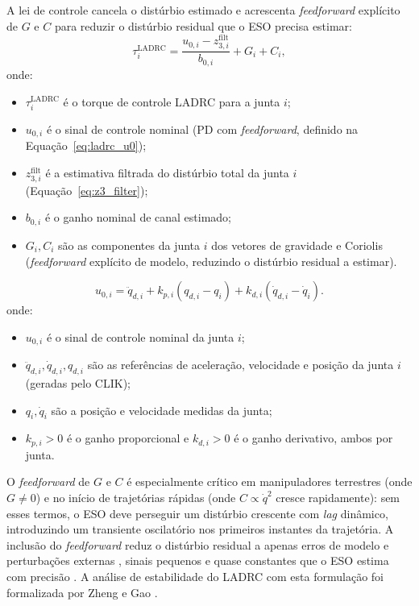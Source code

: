A lei de controle cancela o distúrbio estimado e acrescenta \textit{feedforward} explícito de $G$ e $C$ para reduzir o distúrbio residual que o ESO precisa estimar:
\begin{equation}
    \tau_i^{\text{LADRC}} = \frac{u_{0,i} - z_{3,i}^{\text{filt}}}{b_{0,i}} + G_i + C_i,
    \label{eq:ladrc_ctrl}
\end{equation}
onde:
\begin{itemize}
    \item $\tau_i^{\text{LADRC}}$ é o torque de controle LADRC para a junta $i$;
    \item $u_{0,i}$ é o sinal de controle nominal (PD com \textit{feedforward}, definido na Equação~\eqref{eq:ladrc_u0});
    \item $z_{3,i}^{\text{filt}}$ é a estimativa filtrada do distúrbio total da junta $i$ (Equação~\eqref{eq:z3_filter});
    \item $b_{0,i}$ é o ganho nominal de canal estimado;
    \item $G_i, C_i$ são as componentes da junta $i$ dos vetores de gravidade e Coriolis (\textit{feedforward} explícito de modelo, reduzindo o distúrbio residual a estimar).
\end{itemize}

\begin{equation}
    u_{0,i} = \ddot{q}_{d,i} + k_{p,i}(q_{d,i} - q_i) + k_{d,i}(\dot{q}_{d,i} - \dot{q}_i).
    \label{eq:ladrc_u0}
\end{equation}
onde:
\begin{itemize}
    \item $u_{0,i}$ é o sinal de controle nominal da junta $i$;
    \item $\ddot{q}_{d,i}, \dot{q}_{d,i}, q_{d,i}$ são as referências de aceleração, velocidade e posição da junta $i$ (geradas pelo CLIK);
    \item $q_i, \dot{q}_i$ são a posição e velocidade medidas da junta;
    \item $k_{p,i} > 0$ é o ganho proporcional e $k_{d,i} > 0$ é o ganho derivativo, ambos por junta.
\end{itemize}

O \textit{feedforward} de $G$ e $C$ é especialmente crítico em manipuladores terrestres (onde $G \neq 0$) e no início de trajetórias rápidas (onde $C \propto \dot{q}^2$ cresce rapidamente): sem esses termos, o ESO deve perseguir um distúrbio crescente com \textit{lag} dinâmico, introduzindo um transiente oscilatório nos primeiros instantes da trajetória. A inclusão do \textit{feedforward} reduz o distúrbio residual a apenas erros de modelo e perturbações externas , sinais pequenos e quase constantes que o ESO estima com precisão \cite{han2009pid}. A análise de estabilidade do LADRC com esta formulação foi formalizada por Zheng e Gao \cite{zheng2010practical}.

